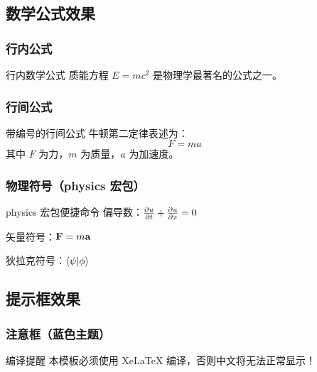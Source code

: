 \documentclass[linux]{hustreport}
\begin{document}
\subsection{数学公式效果}

\subsubsection{行内公式}

\begin{democode}{行内数学公式}
质能方程 $E = mc^2$ 是物理学最著名的公式之一。
\end{democode}

\subsubsection{行间公式}

\begin{demovert}{带编号的行间公式}
牛顿第二定律表述为：
\begin{equation}
    F = ma
\end{equation}
其中 $F$ 为力，$m$ 为质量，$a$ 为加速度。
\end{demovert}

\subsubsection{物理符号（physics 宏包）}

\begin{demovert}{physics 宏包便捷命令}
偏导数：$\pdv{u}{t} + \pdv{u}{x} = 0$

矢量符号：$\vb{F} = m\vb{a}$

狄拉克符号：$\bra{\psi}\ket{\phi}$
\end{demovert}

\subsection{提示框效果}

\subsubsection{注意框（蓝色主题）}

\begin{notice}{编译提醒}
本模板必须使用 XeLaTeX 编译，否则中文将无法正常显示！
\end{notice}
\end{document}
